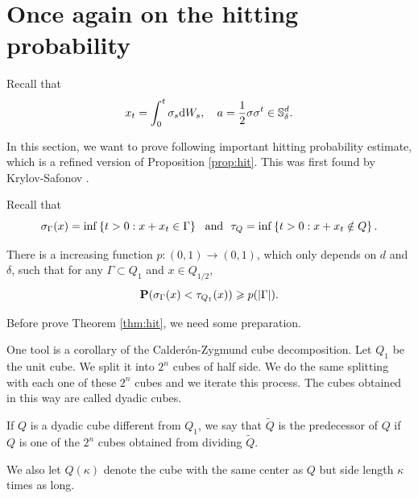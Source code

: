 \section{Once again on the hitting probability}
	Recall that 
	\[
	x_t=\int_0^t \sigma_s \text{\rm{d}} W_s, \quad a=\frac{1}{2}\sigma \sigma^t \in {\mathbb S}^d_\delta. 
	\]
	
	In this section, we want to prove following important hitting probability estimate, which is a refined version of Proposition \ref{prop:hit}. This was first found by Krylov-Safonov \cite{krylov1979estimate}. 
	
	Recall that 
	\[
	    \sigma_{\Gamma}(x)= \inf\left\{t>0: x+x_t\in \Gamma\right\} ~\mbox{ and }~ \tau_Q= \inf\left\{t>0: x+x_t\notin Q\right\}. 
	\]
	\begin{theorem}\label{thm:hit}
		There is a increasing function $p: (0,1)\to (0,1)$, which only depends on $d$ and $\delta$, such that for any $\Gamma \subset Q_1$ and $x\in Q_{1/2}$,  
		\begin{equation}
			{\mathbf P} (\sigma_\Gamma(x)<\tau_{Q_1}(x)) \geqslant p(|\Gamma|). 
		\end{equation}
	\end{theorem}
	
	Before prove Theorem \ref{thm:hit}, we need some preparation.  
	
	One tool is a corollary of the Calderón-Zygmund cube decomposition. Let $Q_1$ be the unit cube. We split it into $2^n$ cubes of half side. We do the same splitting with each one of these $2^n$ cubes and we iterate this process. The cubes obtained in this way are called dyadic cubes. 
	
	If $Q$ is a dyadic cube different from $Q_1$, we say that $\widetilde{Q}$ is the predecessor of $Q$ if $Q$ is one of the $2^n$ cubes obtained from dividing $\widetilde{Q}$.
	
	We also let $Q(\kappa)$ denote the cube with the same center as $Q$ but side length $\kappa$ times as long.
	
